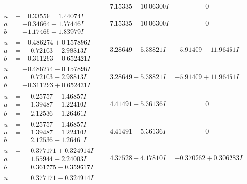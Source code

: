 \documentclass[1p]{elsarticle_modified}
\theoremstyle{definition}
\begin{document}
$$\begin{array}{c|c|c}
 & \phantom{-}7.15335 + 10.06300 I & \phantom{-0.000000 } 0 \\ \hline\begin{aligned}
u &= -0.33559 - 1.44074 I \\
a &= -0.34664 - 1.77446 I \\
b &= -1.17465 - 1.83979 I\end{aligned}
 & \phantom{-}7.15335 - 10.06300 I & \phantom{-0.000000 } 0 \\ \hline\begin{aligned}
u &= -0.486274 + 0.157896 I \\
a &= \phantom{-}0.72103 - 2.98813 I \\
b &= -0.311293 - 0.652421 I\end{aligned}
 & \phantom{-}3.28649 + 5.38821 I & -5.91409 - 11.96451 I \\ \hline\begin{aligned}
u &= -0.486274 - 0.157896 I \\
a &= \phantom{-}0.72103 + 2.98813 I \\
b &= -0.311293 + 0.652421 I\end{aligned}
 & \phantom{-}3.28649 - 5.38821 I & -5.91409 + 11.96451 I \\ \hline\begin{aligned}
u &= \phantom{-}0.25757 + 1.46857 I \\
a &= \phantom{-}1.39487 + 1.22410 I \\
b &= \phantom{-}2.12536 + 1.26461 I\end{aligned}
 & \phantom{-}4.41491 - 5.36136 I & \phantom{-0.000000 } 0 \\ \hline\begin{aligned}
u &= \phantom{-}0.25757 - 1.46857 I \\
a &= \phantom{-}1.39487 - 1.22410 I \\
b &= \phantom{-}2.12536 - 1.26461 I\end{aligned}
 & \phantom{-}4.41491 + 5.36136 I & \phantom{-0.000000 } 0 \\ \hline\begin{aligned}
u &= \phantom{-}0.377171 + 0.324914 I \\
a &= \phantom{-}1.55944 + 2.24003 I \\
b &= \phantom{-}0.361775 - 0.359617 I\end{aligned}
 & \phantom{-}4.37528 + 4.17810 I & -0.370262 + 0.306283 I \\ \hline\begin{aligned}
u &= \phantom{-}0.377171 - 0.324914 I \\

\end{aligned}
\end{array}$$
\end{document}
